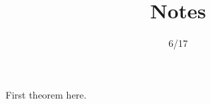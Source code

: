 \documentclass[12pt]{scrartcl}
\title{Notes}
\date{6/17}
\begin{document}
\begin{theorem}
    First theorem here.
\end{theorem}
\end{document}
